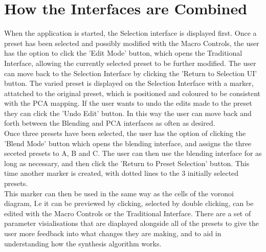 \documentclass[11pt, oneside]{report}   	%
\begin{document}
\section{How the Interfaces are Combined}
When the application is started, the Selection interface is displayed first. Once a preset has been selected and possibly modified with the Macro Controls, the user has the option to click the 'Edit Mode' button, which opens the Traditional Interface, allowing the currently selected preset to be further modified. The user can move back to the Selection Interface by clicking the 'Return to Selection UI' button. The varied preset is displayed on the Selection Interface with a marker, attatched to the original preset, which is positioned and coloured to be consistent with the PCA mapping. If the user wants to undo the edits made to the preset they can click the 'Undo Edit' button. In this way the user can move back and forth between the Blending and PCA interfaces as often as desired.\\
Once three presets have been selected, the user has the option of clicking the 'Blend Mode' button which opens the blending interface, and assigns the three seceted presets to A, B and C. The user can then use the blending interface for as long as necessary, and then click the 'Return to Preset Selection' button. This time another marker is created, with dotted lines to the 3 initially selected presets.\\ 
This marker can then be used in the same way as the cells of the voronoi diagram, I.e it can be previewed by clicking, selected by double clicking, can be edited with the Macro Controls or the Traditional Interface. There are a set of parameter visialisations that are diaplayed alongside all of the presets to give the user more feedback into what changes they are making, and to aid in understanding how the synthesis algorithm works.
\end{document}
